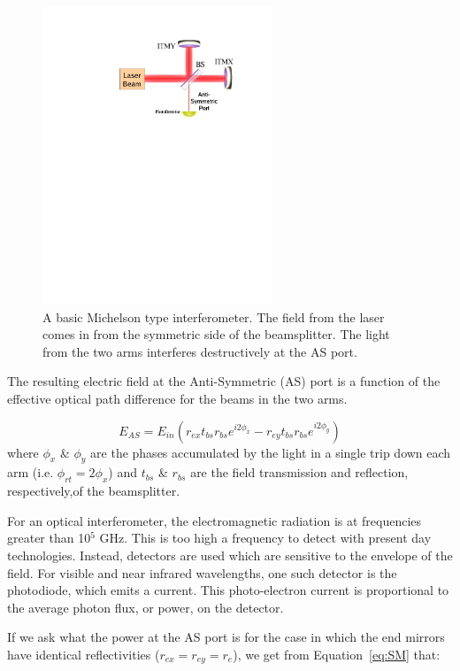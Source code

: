 \begin{figure}[!h]
\centerline{\includegraphics[angle=0,height=3.5in]{Figures/Chap2/Michelson.pdf}}
\caption[Michelson Diagram]{A basic Michelson type interferometer. The field from the
         laser comes in from the symmetric side of the beamsplitter. The light from the
         two arms interferes destructively at the AS port.}
\label{fig:Michelson}
\end{figure}
The resulting electric field at the Anti-Symmetric (AS) port is a function of
the effective optical path difference for the beams in the two arms. 

\begin{equation}
E_{AS} = E_{in} (r_{ex} t_{bs} r_{bs} e^{i 2 \phi_x} - r_{ey} t_{bs} r_{bs} e^{i 2 \phi_y})
\label{eq:SM}
\end{equation}
where  $\phi_x$ \& $\phi_y$ are the phases accumulated by the light in a single trip
down each arm (i.e. $\phi_{rt} = 2 \phi_x$) and $t_{bs}$ \& $r_{bs}$ are the field 
transmission and reflection, respectively,of the beamsplitter.

For an optical interferometer, the electromagnetic radiation is at frequencies
greater than 10$^5$ GHz. This is too high a frequency to detect with present day
technologies. Instead, detectors are used which are sensitive to the envelope of
the field. For visible and near infrared wavelengths, one such detector is the 
photodiode, which emits a current. This photo-electron current is proportional 
to the average photon flux, or power, on the detector.

If we ask what the power at the AS port is for the case in which the end mirrors
have identical reflectivities ($r_{ex} = r_{ey} = r_e$), we get from 
Equation~\ref{eq:SM} that:

